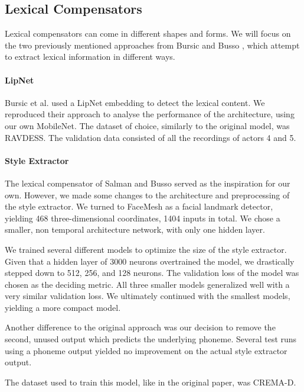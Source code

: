 \subsection{Lexical Compensators}
\label{sub:lex}
Lexical compensators can come in different shapes and forms. We will focus on the two previously mentioned approaches from Bursic \cite{bursic2020improving} and Busso \cite{salman2020style}, which attempt to extract lexical information in different ways.

\paragraph{LipNet} 
Bursic et al. \cite{bursic2020improving} used a LipNet embedding to detect the lexical content. We reproduced their approach to analyse the performance of the architecture, using our own MobileNet. The dataset of choice, similarly to the original model, was RAVDESS. The validation data consisted of all the recordings of actors 4 and 5.

\paragraph{Style Extractor}
The lexical compensator of Salman and Busso \cite{salman2020style} served as the inspiration for our own. However, we made some changes to the architecture and preprocessing of the style extractor. We turned to FaceMesh as a facial landmark detector, yielding 468 three-dimensional coordinates, 1404 inputs in total. We chose a smaller, non temporal architecture network, with only one hidden layer.

We trained several different models to optimize the size of the style extractor. Given that a hidden layer of 3000 neurons overtrained the model, we drastically stepped down to 512, 256, and 128 neurons. The validation loss of the model was chosen as the deciding metric. 
All three smaller models generalized well with a very similar validation loss. We ultimately continued with the smallest models, yielding a more compact model.

Another difference to the original approach was our decision to remove the second, unused output which predicts the underlying phoneme. Several test runs using a phoneme output yielded no improvement on the actual style extractor output.

The dataset used to train this model, like in the original paper, was CREMA-D.

